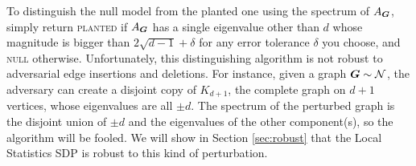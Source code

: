\begin{remark}
    To distinguish the null model from the planted one using the spectrum of $A_{\boldsymbol{G}}$, simply return \textsc{planted} if $A_{\boldsymbol{G}}$ has a single eigenvalue other than $d$ whose magnitude is bigger than $2\sqrt{d-1} + \delta$ for any error tolerance $\delta$ you choose, and \textsc{null} otherwise. Unfortunately, this distinguishing algorithm is not robust to adversarial edge insertions and deletions. For instance, given a graph $\boldsymbol{G} \sim \mathcal{N}$, the adversary can create a disjoint copy of $K_{d+1}$, the complete graph on $d+1$ vertices, whose eigenvalues are all $\pm d$. The spectrum of the perturbed graph is the disjoint union of $\pm d$ and the eigenvalues of the other component(s), so the algorithm will be fooled.  We will show in Section \ref{sec:robust} that the Local Statistics SDP is robust to this kind of perturbation.
\end{remark}

